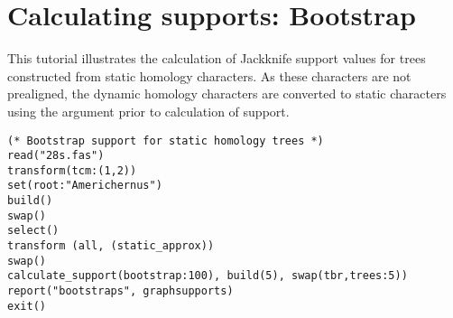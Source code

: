 
\section{Calculating supports: Bootstrap}{\label{tutorial6}}

This tutorial illustrates the calculation of Jackknife support values for trees constructed from static homology characters. 
As these characters are not prealigned, the dynamic homology characters are converted to static 
characters using the argument  prior to calculation of support.

\begin{verbatim}
(* Bootstrap support for static homology trees *)
read("28s.fas")
transform(tcm:(1,2))
set(root:"Americhernus")
build()
swap()
select()
transform (all, (static_approx))
swap()
calculate_support(bootstrap:100), build(5), swap(tbr,trees:5))
report("bootstraps", graphsupports)
exit()
\end{verbatim}

